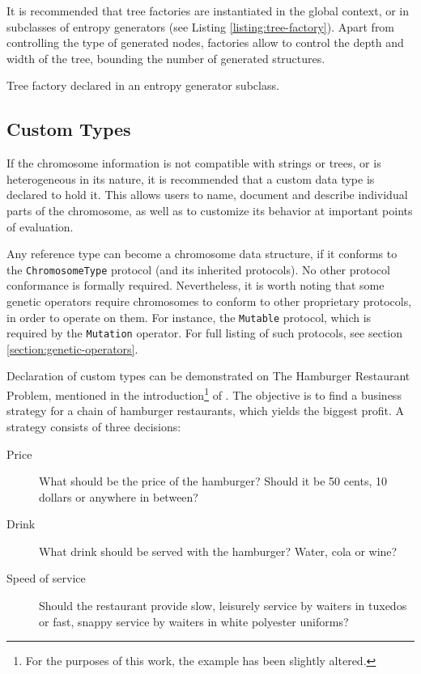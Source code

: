 It is recommended that tree factories are instantiated in the global context, or in subclasses of entropy generators (see Listing \ref{listing:tree-factory}). Apart from controlling the type of generated nodes, factories allow to control the depth and width of the tree, bounding the number of generated structures.

\begin{listing}[ht]
	\caption{Tree factory declared in an entropy generator subclass.}
	\label{listing:tree-factory}
\end{listing}

\subsection{Custom Types}\label{section:custom-types}
If the chromosome information is not compatible with strings or trees, or is heterogeneous in its nature, it is recommended that a custom data type is declared to hold it. This allows users to name, document and describe individual parts of the chromosome, as well as to customize its behavior at important points of evaluation.

Any reference type can become a chromosome data structure, if it conforms to the \texttt{ChromosomeType} protocol (and its inherited protocols). No other protocol conformance is formally required. Nevertheless, it is worth noting that some genetic operators require chromosomes to conform to other proprietary protocols, in order to operate on them. For instance, the \texttt{Mutable} protocol, which is required by the \texttt{Mutation} operator. For full listing of such protocols, see section \ref{section:genetic-operators}.

Declaration of custom types can be demonstrated on The Hamburger Restaurant Problem, mentioned in the introduction\footnote{For the purposes of this work, the example has been slightly altered.} of \cite{Koza1992}. The objective is to find a business strategy for a chain of hamburger restaurants, which yields the biggest profit. A strategy consists of three decisions:
~
\begin{description}
	\item[Price]
	What should be the price of the hamburger? Should it be 50 cents, 10 dollars or anywhere in between?

	\item[Drink]
	What drink should be served with the hamburger? Water, cola or wine?

	\item[Speed of service]
	Should the restaurant provide slow, leisurely service by waiters in tuxedos or fast, snappy service by waiters in white polyester uniforms?
\end{description}

